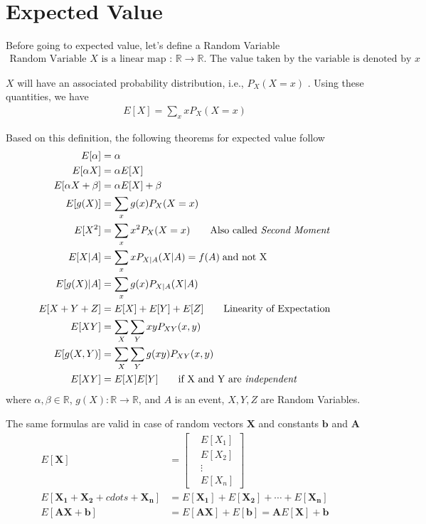 \documentclass[../probability-notes.tex]{subfiles}
\begin{document}
    \section{Expected Value}
    Before going to expected value, let's define a Random Variable
    \begin{align*}
        \text{Random Variable } X \text{ is a linear map : } \mathbb{R} \to \mathbb{R} \text{. The value taken by the variable is denoted by } x
    \end{align*}

    $X$ will have an associated probability distribution, i.e., $P_{X}(X = x)$ . Using these quantities, we have
    \begin{align*}
        E[X] = \sum_x xP_{X}(X = x) \tag*{Expected Value}
    \end{align*}

    Based on this definition, the following theorems for expected value follow
    \begin{align*}
        E[\alpha] &= \alpha\\
        E[\alpha X] &= \alpha E[X] \\
        E[\alpha X + \beta] &= \alpha E[X] + \beta \\
        E[g(X)] &= \sum_x g(x)P_{X}(X = x) \\
        E[X^{2}] &= \sum_x x^{2} P_{X}(X = x) \tag*{Also called \emph{Second Moment}}\\
        E[X|A] &= \sum_{x} x P_{X|A}(X|A) = f(A)\;\text{and not X}\\
        E[g(X)|A] &= \sum_{x} g(x) P_{X|A}(X|A) \\
        E[X + Y + Z] &= E[X] + E[Y] + E[Z] \tag*{Linearity of Expectation}\\
        E[XY] &= \sum_{X} \sum_{Y} xy P_{XY}(x,y) \\
        E[g(X,Y)] &= \sum_{X} \sum_{Y} g(xy) P_{XY}(x,y) \\
        E[XY] &= E[X]E[Y] \tag*{if X and Y are \emph{independent}}
    \end{align*}
    where $\alpha, \beta \in \mathbb{R}$, $g(X) : \mathbb{R} \rightarrow \mathbb{R}$, and $A$ is an event, $X, Y, Z$ are Random Variables.\newline

    The same formulas are valid in case of random vectors $\mathbf{X}$ and constants $\mathbf{b}$ and $\mathbf{A}$
    \begin{align*}
        E[\mathbf{X}] &= \begin{bmatrix}
        &E[X_{1}]\\
        &E[X_{2}]\\
        &\vdots\\
        &E[X_{n}]
        \end{bmatrix}\\
        E[\mathbf{X_{1}} + \mathbf{X_{2}} + cdots + \mathbf{X_{n}}] &= E[\mathbf{X_{1}}] + E[\mathbf{X_{2}}] + \cdots + E[\mathbf{X_{n}}]\\
        E[\mathbf{A}\mathbf{X}+\mathbf{b}] &= E[\mathbf{A}\mathbf{X}] + E[\mathbf{b}] = \mathbf{A}E[\mathbf{X}] + \mathbf{b}\\
    \end{align*}
\end{document}
